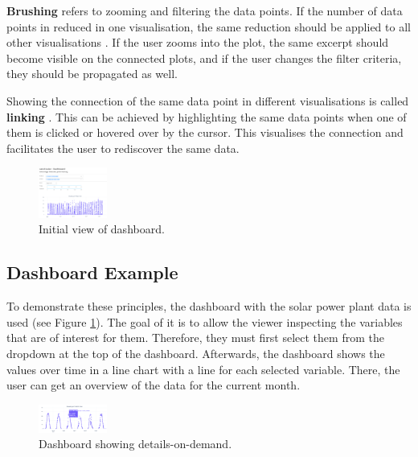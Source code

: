 \documentclass[11pt]{article}
\begin{document}
\textbf{Brushing} refers to zooming and filtering the data points. If the number of data points in reduced in one visualisation, the same reduction should be applied to all other visualisations \parencite{becker_brushing_1987}. If the user zooms into the plot, the same excerpt should become visible on the connected plots, and if the user changes the filter criteria, they should be propagated as well. 

Showing the connection of the same data point in different visualisations is called \textbf{linking} \parencite{noauthor_linking_nodate}. This can be achieved by highlighting the same data points when one of them is clicked or hovered over by the cursor. This visualises the connection and facilitates the user to rediscover the same data. 

\begin{figure}
    \includegraphics[width=0.2\textwidth]{./dashboard.png}
    \caption{Initial view of dashboard.}
    \label{dashboard}
\end{figure}

\subsection{Dashboard Example}

To demonstrate these principles, the dashboard with the solar power plant data is used (see Figure \ref{dashboard}). The goal of it is to allow the viewer inspecting the variables that are of interest for them. Therefore, they must first select them from the dropdown at the top of the dashboard. Afterwards, the dashboard shows the values over time in a line chart with a line for each selected variable. There, the user can get an overview of the data for the current month. 

\begin{figure}
    \includegraphics[width=0.2\textwidth]{./dashboard-details.png}
    \caption{Dashboard showing details-on-demand.}
    \label{dashboard-details}
\end{figure}
\end{document}
